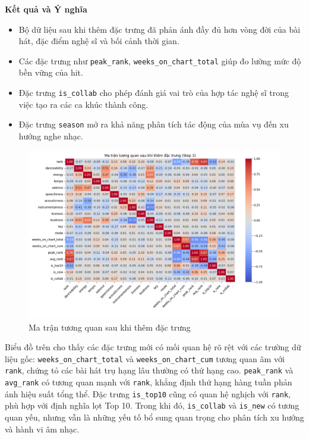 \textbf{Kết quả và Ý nghĩa} 

\begin{itemize}
    \item Bộ dữ liệu sau khi thêm đặc trưng đã phản ánh đầy đủ hơn vòng đời của bài hát, đặc điểm nghệ sĩ và bối cảnh thời gian.
    \item Các đặc trưng như \texttt{peak\_rank}, \texttt{weeks\_on\_chart\_total} giúp đo lường mức độ bền vững của hit. 
    \item Đặc trưng \texttt{is\_collab} cho phép đánh giá vai trò của hợp tác nghệ sĩ trong việc tạo ra các ca khúc thành công.
    \item Đặc trưng \texttt{season} mở ra khả năng phân tích tác động của mùa vụ đến xu hướng nghe nhạc.
\end{itemize}

\begin{figure}[H]
    \centering
    \includegraphics[width=1.0\textwidth]{../graphics/data3/Output/step3/correlation_matrix_step3.png}
    \caption{Ma trận tương quan sau khi thêm đặc trưng}
    \label{fig:corr_step3}
\end{figure}

Biểu đồ trên cho thấy các đặc trưng mới có mối quan hệ rõ rệt với các trường dữ liệu gốc: \texttt{weeks\_on\_chart\_total} và \texttt{weeks\_on\_chart\_cum} tương quan âm với \texttt{rank}, chứng tỏ các bài hát trụ hạng lâu thường có thứ hạng cao. \texttt{peak\_rank} và \texttt{avg\_rank} có tương quan mạnh với \texttt{rank}, khẳng định thứ hạng hàng tuần phản ánh hiệu suất tổng thể. 
Đặc trưng \texttt{is\_top10} cũng có quan hệ nghịch với \texttt{rank}, 
phù hợp với định nghĩa lọt Top 10. Trong khi đó, \texttt{is\_collab} và \texttt{is\_new} có tương quan yếu, nhưng vẫn là những yếu tố bổ sung quan trọng cho phân tích xu hướng và hành vi âm nhạc. 

